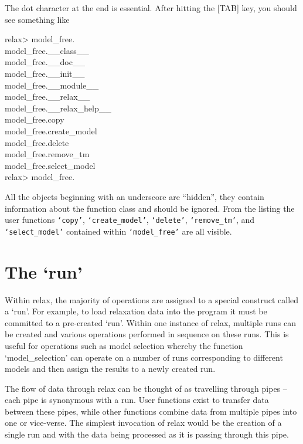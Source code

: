 
The dot character at the end is essential.  After hitting the [TAB] key, you should see something like

\begin{exampleenv}
relax> model\_free. \\
model\_free.\_\_class\_\_ \\
model\_free.\_\_doc\_\_ \\
model\_free.\_\_init\_\_ \\
model\_free.\_\_module\_\_ \\
model\_free.\_\_relax\_\_ \\
model\_free.\_\_relax\_help\_\_ \\
model\_free.copy \\
model\_free.create\_model \\
model\_free.delete \\
model\_free.remove\_tm \\
model\_free.select\_model \\
relax> model\_free. \\
\end{exampleenv}

All the objects beginning with an underscore are ``hidden'', they contain information about the function class and should be ignored.  From the listing the user functions \texttt{`copy'}, \texttt{`create\_model'}, \texttt{`delete'}, \texttt{`remove\_tm'}, and \texttt{`select\_model'} contained within \texttt{`model\_free'} are all visible.




\section{The `run'}

Within relax, the majority of operations are assigned to a special construct called a `run'.  For example, to load relaxation data into the program it must be committed to a pre-created `run'.  Within one instance of relax, multiple runs can be created and various operations performed in sequence on these runs.  This is useful for operations such as model selection whereby the function `model\_selection' can operate on a number of runs corresponding to different models and then assign the results to a newly created run.

The flow of data through relax can be thought of as travelling through pipes -- each pipe is synonymous with a run.  User functions exist to transfer data between these pipes, while other functions combine data from multiple pipes into one or vice-verse.  The simplest invocation of relax would be the creation of a single run and with the data being processed as it is passing through this pipe.

